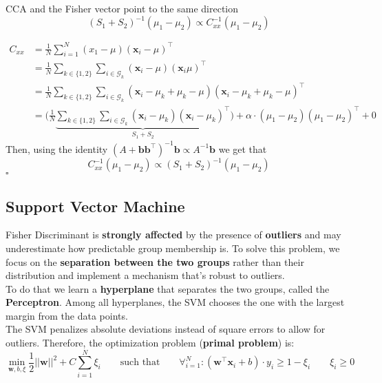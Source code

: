 \begin{proposition}
	CCA and the Fisher vector point to the same direction
	\begin{equation}
		(S_1 + S_2)^{-1}(\mu_1 - \mu_2) \propto C_{xx}^{-1}(\mu_1 - \mu_2)
	\end{equation}
\end{proposition}
\begin{demonstration}
	\begin{align*}
		C_{xx} & = \frac{1}{N} \sum_{i=1}^{N} (x_1 - \mu)(\mathbf{x}_i - \mu)^\top \\
		& = \frac{1}{N} \sum_{k \in \{1,2\}}\sum_{i \in \mathcal{G}_k} (\mathbf{x}_i - \mu) (\mathbf{x}_i \mu)^\top \\
		& = \frac{1}{N} \sum_{k \in \{1,2\}}\sum_{i \in \mathcal{G}_k} (\mathbf{x}_i -\mu_k + \mu_k -\mu)(\mathbf{x}_i - \mu_k + \mu_k -\mu)^\top \\
		& = \bigg(\frac{1}{N} \underbrace{\sum_{k \in \{1,2\}}\sum_{i \in \mathcal{G}_k} (\mathbf{x}_i-\mu_k)(\mathbf{x}_i - \mu_k)^\top}_{S_1 + S_2}\bigg) + \alpha \cdot (\mu_1 - \mu_2)(\mu_1 - \mu_2)^\top + 0
	\end{align*}
	Then, using the identity $(A + \mathbf{b}\mathbf{b}^\top)^{-1} \mathbf{b} \propto A^{-1}\mathbf{b}$ we get that
	\begin{equation*}
		C_{xx}^{-1}(\mu_1 - \mu_2) \propto (S_1 + S_2)^{-1} (\mu_1 - \mu_2)
	\end{equation*}
	\hfill $\square$
\end{demonstration}

\subsection{Support Vector Machine}
Fisher Discriminant is \textbf{strongly affected} by the presence of \textbf{outliers} and may underestimate how predictable group membership is. To solve this problem, we focus on the \textbf{separation between the two groups} rather than their distribution and implement a mechanism that's robust to outliers.\\

To do that we learn a \textbf{hyperplane} that separates the two groups, called the \textbf{Perceptron}. Among all hyperplanes, the SVM chooses the one with the largest margin from the data points.\\
The SVM penalizes absolute deviations instead of square errors to allow for outliers. Therefore, the optimization problem (\textbf{primal problem}) is:
\begin{equation}
	\min_{\mathbf{w},b, \xi} \frac{1}{2} \lvert\lvert \mathbf{w} \rvert\rvert ^2 + C \sum_{i=1}^{N} \xi_i \qquad\text{such that} \qquad \forall_{i=1}^N : (\mathbf{w}^\top \mathbf{x}_i+b) \cdot y_i \geq 1-\xi_i \qquad \xi_i \geq 0
\end{equation}

